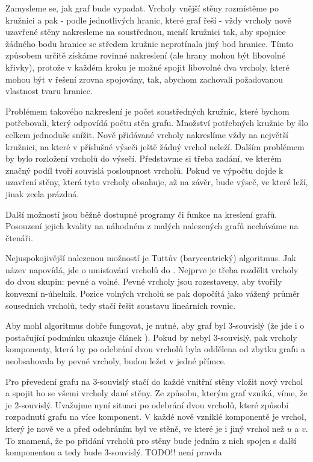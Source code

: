 Zamysleme se, jak graf bude vypadat. Vrcholy vnější stěny rozmístěme po kružnici a pak - podle jednotlivých hranic, které graf řeší - vždy vrcholy nově uzavřené stěny nakresleme na soustřednou, menší kružnici tak, aby spojnice žádného bodu hranice se středem kružnic neprotínala jiný bod hranice. Tímto způsobem určitě získáme rovinné nakreslení (ale hrany mohou být libovolné křivky), protože v každém kroku je možné spojit libovolné dva vrcholy, které mohou být v řešení zrovna spojovány, tak, abychom zachovali požadovanou vlastnost tvaru hranice.

Problémem takového nakreslení je počet soustředných kružnic, které bychom potřebovali, který odpovídá počtu stěn grafu. Množství potřebných kružnic by šlo celkem jednoduše snížit. Nově přidávané vrcholy nakreslíme vždy na největší kružnici, na které v příslušné výseči ještě žádný vrchol neleží. Dalším problémem by bylo rozložení vrcholů do výsečí. Představme si třeba zadání, ve kterém značný podíl tvoří souvislá posloupnost  vrcholů. Pokud ve výpočtu dojde k uzavření stěny, která tyto vrcholy obsahuje, až na závěr, bude výseč, ve které leží, jinak zcela prázdná.

Další možností jsou běžně dostupné programy či funkce na kreslení grafů. Posouzení jejich kvality na náhodném z malých nalezených grafů necháváme na čtenáři.

Nejuspokojivější nalezenou možností je Tuttův (barycentrický) algoritmus. Jak název napovídá, jde o umisťování vrcholů do . Nejprve je třeba rozdělit vrcholy do dvou skupin: pevné a volné. Pevné vrcholy jsou rozestaveny, aby tvořily konvexní n-úhelník. Pozice volných vrcholů se pak dopočítá jako vážený průměr sousedních vrcholů, tedy stačí řešit soustavu lineárních rovnic.

Aby mohl algoritmus dobře fungovat, je nutné, aby graf byl 3-souvislý (že jde i o postačující podmínku ukazuje článek  \cite{Tutte}). Pokud by nebyl 3-souvislý, pak vrcholy komponenty, která by po odebrání dvou vrcholů byla oddělena od zbytku grafu a neobsahovala by pevné vrcholy, budou ležet v jedné přímce.

Pro převedení grafu na 3-souvislý stačí do každé vnitřní stěny vložit nový vrchol a spojit ho se všemi vrcholy dané stěny. Ze způsobu, kterým graf vzniká, víme, že je 2-souvislý. Uvažujme nyní situaci po odebrání dvou vrcholů, které způsobí rozpadnutí grafu na více komponent. V každé nově vzniklé komponentě je vrchol, který je nově ve  a před odebráním byl ve stěně, ve které je i jiný vrchol než $u$ a $v$. To znamená, že po přidání vrcholů pro stěny bude jedním z nich spojen s další komponentou a tedy bude 3-souvislý.  TODO!! není pravda

